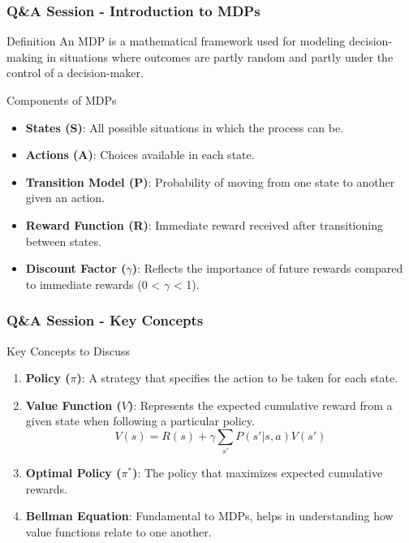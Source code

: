 \documentclass[aspectratio=169]{beamer}
\begin{document}
\begin{frame}[fragile]
  \frametitle{Q\&A Session - Introduction to MDPs}
  \begin{block}{Definition}
    An MDP is a mathematical framework used for modeling decision-making in situations where outcomes are partly random and partly under the control of a decision-maker.
  \end{block}

  \begin{block}{Components of MDPs}
    \begin{itemize}
      \item \textbf{States (S)}: All possible situations in which the process can be.
      \item \textbf{Actions (A)}: Choices available in each state.
      \item \textbf{Transition Model (P)}: Probability of moving from one state to another given an action.
      \item \textbf{Reward Function (R)}: Immediate reward received after transitioning between states.
      \item \textbf{Discount Factor ($\gamma$)}: Reflects the importance of future rewards compared to immediate rewards (0 < $\gamma$ < 1).
    \end{itemize}
  \end{block}
\end{frame}

\begin{frame}[fragile]
  \frametitle{Q\&A Session - Key Concepts}
  \begin{block}{Key Concepts to Discuss}
    \begin{enumerate}
      \item \textbf{Policy ($\pi$)}: A strategy that specifies the action to be taken for each state.
      \item \textbf{Value Function ($V$)}: Represents the expected cumulative reward from a given state when following a particular policy.
        \begin{equation}
          V(s) = R(s) + \gamma \sum_{s'} P(s'|s, a) V(s')
        \end{equation}
      \item \textbf{Optimal Policy ($\pi^*$)}: The policy that maximizes expected cumulative rewards.
      \item \textbf{Bellman Equation}: Fundamental to MDPs, helps in understanding how value functions relate to one another.
    \end{enumerate}
  \end{block}
\end{frame}
\end{document}

